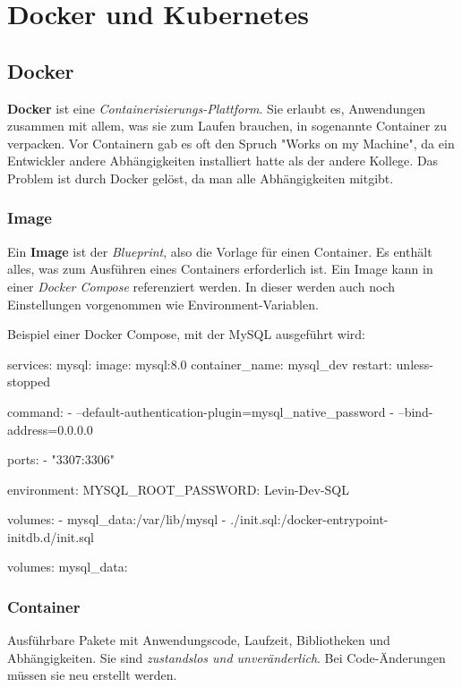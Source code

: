 \section{Docker und Kubernetes}

\subsection{Docker}
\textbf{Docker} ist eine \emph{Containerisierungs-Plattform}. Sie erlaubt es, Anwendungen zusammen mit allem, was sie zum Laufen brauchen, in sogenannte Container zu verpacken. Vor Containern gab es oft den Spruch "Works on my Machine", da ein Entwickler andere Abhängigkeiten installiert hatte als der andere Kollege. Das Problem ist durch Docker gelöst, da man alle Abhängigkeiten mitgibt.

\subsubsection{Image}
Ein \textbf{Image} ist der \textit{Blueprint}, also die Vorlage für einen Container. Es enthält alles, was zum Ausführen eines Containers erforderlich ist. Ein Image kann in einer \textit{Docker Compose} referenziert werden. In dieser werden auch noch Einstellungen vorgenommen wie Environment-Variablen.

Beispiel einer Docker Compose, mit der MySQL ausgeführt wird:

\begin{syntaxbox}[YAML]
services:
  mysql:
    image: mysql:8.0
    container_name: mysql_dev
    restart: unless-stopped

    command:
      - --default-authentication-plugin=mysql_native_password
      - --bind-address=0.0.0.0

    ports:
      - "3307:3306"

    environment:
      MYSQL_ROOT_PASSWORD: Levin-Dev-SQL

    volumes:
      - mysql_data:/var/lib/mysql
      - ./init.sql:/docker-entrypoint-initdb.d/init.sql

volumes:
  mysql_data:
\end{syntaxbox}

\subsubsection{Container}
Ausführbare Pakete mit Anwendungscode, Laufzeit, Bibliotheken und Abhängigkeiten. Sie sind \emph{zustandslos und unveränderlich}. Bei Code-Änderungen müssen sie neu erstellt werden.

